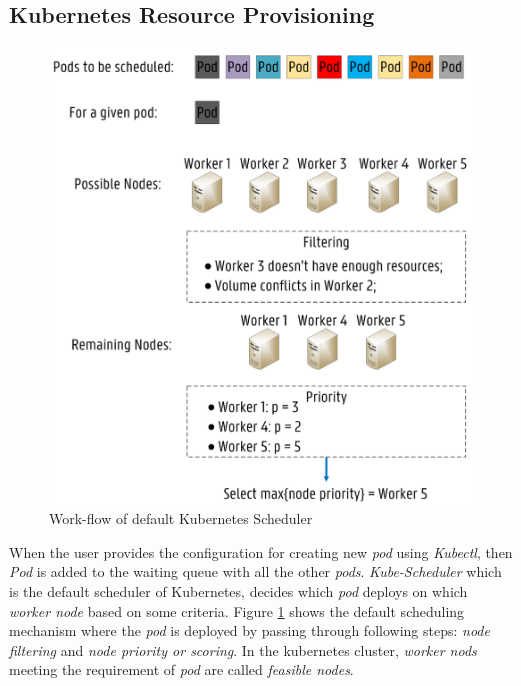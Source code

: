   \subsection{Kubernetes Resource Provisioning}
  \label{sec:k8s_scheduler}
  \begin{figure}
    \centering
    \includegraphics[width=\linewidth]{figures/mlcn-k8s-scheduler.pdf}
    \caption{Work-flow of default Kubernetes Scheduler\cite{Santos2019}}
    \label{fig:k8s-sch}
  \end{figure}
  When the user provides the configuration for creating new \emph{pod} using \emph{Kubectl}, then \emph{Pod} is added to the waiting queue with all the other \emph{pods}\cite{Santos2019}. \emph{Kube-Scheduler} which is the default scheduler of Kubernetes, decides which \emph{pod} deploys on which \emph{worker node} based on some criteria. Figure \ref{fig:k8s-sch} shows the default scheduling mechanism where the \emph{pod} is deployed by passing through following steps: \emph{node filtering} and \emph{node priority or scoring}\cite{Santos2019}. In the kubernetes cluster, \emph{worker nods} meeting the requirement of \emph{pod} are called \emph{feasible nodes}\cite{k8s}.
